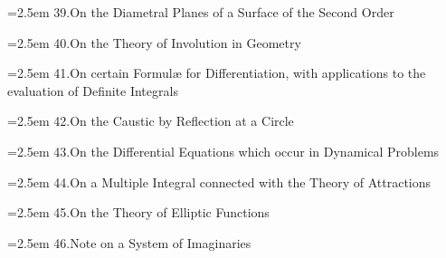 \documentclass[11pt]{article}
\begin{document}
\noindent\hangindent=2.5em
39.\quad On the Diametral Planes of a Surface of the Second Order\par
\hspace{1.5em}{\small Camb.\ and Dubl.\ Math.\ Jour.\ t.~i.\ (1846), pp.~274--278}\par

\noindent\hangindent=2.5em
40.\quad On the Theory of Involution in Geometry\par
\hspace{1.5em}{\small Camb.\ and Dubl.\ Math.\ Jour.\ t.~ii.\ (1847), pp.~52--61}\par

\noindent\hangindent=2.5em
41.\quad On certain Formul\ae{} for Differentiation, with applications to the evaluation of Definite Integrals\par
\hspace{1.5em}{\small Camb.\ and Dubl.\ Math.\ Jour.\ t.~ii.\ (1847), pp.~122--128}\par

\noindent\hangindent=2.5em
42.\quad On the Caustic by Reflection at a Circle\par
\hspace{1.5em}{\small Camb.\ and Dubl.\ Math.\ Jour.\ t.~ii.\ (1847), pp.~128--130}\par

\noindent\hangindent=2.5em
43.\quad On the Differential Equations which occur in Dynamical Problems\par
\hspace{1.5em}{\small Camb.\ and Dubl.\ Math.\ Jour.\ t.~ii.\ (1847), pp.~210--219}\par

\bigskip

\noindent\hangindent=2.5em
44.\quad On a Multiple Integral connected with the Theory of Attractions\par
\hspace{1.5em}{\small Camb.\ and Dubl.\ Math.\ Jour.\ t.~ii.\ (1847), pp.~219--223}\par

\noindent\hangindent=2.5em
45.\quad On the Theory of Elliptic Functions\par
\hspace{1.5em}{\small Camb.\ and Dubl.\ Math.\ Jour.\ t.~ii.\ (1847), pp.~256--266}\par

\noindent\hangindent=2.5em
46.\quad Note on a System of Imaginaries\par
\hspace{1.5em}{\small Phil.\ Mag.\ t.~xxx.\ (1847), pp.~257, 258}\par
\end{document}
